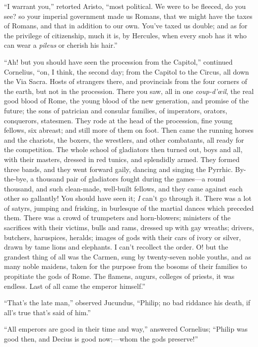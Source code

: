 ``I warrant you,'' retorted Aristo, ``most political.
We were to be fleeced, do you see? so your imperial government made us
Romans, that we might have the taxes of Romans, and that in addition
to our own. You've taxed us double; and as for the privilege of citizenship, much it is, by Hercules, when every snob has it who can
wear a \emph{pileus} or cherish his hair.''

``Ah! but you should have seen the procession from the
Capitol,'' continued Cornelius, ``on, I think, the second day;
from the Capitol to the Circus, all down the Via Sacra. Hosts of
strangers there, and provincials from the four corners of the earth,
but not in the procession. There you saw, all in one \emph{coup-d'œil},
the real good blood of Rome, the young blood of the new generation,
and promise of the future; the sons of patrician and consular
families, of imperators, orators, conquerors, statesmen. They rode at
the head of the procession, fine young fellows, six abreast; and still
more of them on foot. Then came the running horses and the chariots,
the boxers, the wrestlers, and other combatants, all ready for the
competition. The whole school of gladiators then turned out, boys and
all, with their masters, dressed in red tunics, and splendidly armed.
They formed three bands, and they went forward gaily, dancing and
singing the Pyrrhic. By-the-bye, a thousand pair of gladiators fought
during the games—a round thousand, and such clean-made, well-built
fellows, and they came against each other so gallantly! You should
have seen it; \emph{I} can't go through it. There was a lot of
satyrs, jumping and frisking, in burlesque of the martial dances which
preceded them. There was a crowd of trumpeters and horn-blowers;
ministers of the sacrifices with their victims, bulls and rams,
dressed up with gay wreaths; drivers, butchers, haruspices, heralds; images of gods with their cars of ivory or silver, drawn by
tame lions and elephants. I can't recollect the order. O! but the
grandest thing of all was the Carmen, sung by twenty-seven noble
youths, and as many noble maidens, taken for the purpose from the
bosoms of their families to propitiate the gods of Rome. The flamens,
augurs, colleges of priests, it was endless. Last of all came the
emperor himself.''

``That's the late man,'' observed Jucundus, ``Philip;
no bad riddance his death, if all's true that's said of him.''

``All emperors are good in their time and way,'' answered
Cornelius; ``Philip was good then, and Decius is good now;—whom
the gods preserve!''

